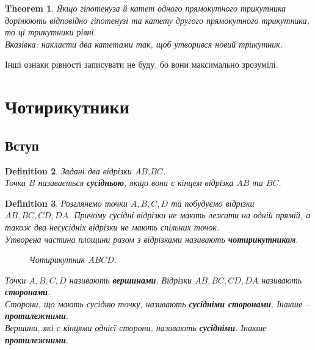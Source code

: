 \documentclass[a4paper, 10pt]{article}
\theoremstyle{theoremdd}
\newtheorem{theorem}{Theorem}[subsection]
\theoremstyle{theoremdd}
\theoremstyle{theoremdd}
\newtheorem{definition}[theorem]{Definition}
\theoremstyle{theoremdd}
\theoremstyle{theoremdd}
\theoremstyle{theoremdd}
\theoremstyle{theoremdd}
\theoremstyle{theoremdd}
\theoremstyle{theoremdd}
\begin{document}
\begin{theorem}
Якщо гіпотенуза й катет одного прямокутного трикутника дорінюють відповідно гіпотенузі та катету другого прямокутного трикутника, то ці трикутники рівні.\\
\textit{Вказівка: накласти два катетами так, щоб утворився новий трикутник.}
\end{theorem}
Інші ознаки рівності записувати не буду, бо вони максимально зрозумілі.
\newpage
\fi

\section{Чотирикутники}
\subsection{Вступ}
\begin{definition}
Задані два відрізки $AB$,$BC$.\\
Точка $B$ називається \textbf{сусідньою}, якщо вона є кінцем відрізка $AB$ та $BC$.
\begin{figure}[H]
\centering
{}
\end{figure}
\end{definition}

\begin{definition}
Розглянемо точки $A,B,C,D$ та побудуємо відрізки $AB,BC,CD,DA$. Причому сусідні відрізки не мають лежати на одній прямій, а також два несусідніх відрізки не мають спільних точок.\\
Утворена частина площини разом з відрізками називають \textbf{чотирикутником}.
\begin{figure}[H]
\centering
{}
\caption*{Чотирикутник $ABCD$.}
\end{figure}
Точки $A,B,C,D$ називають \textbf{вершинами}. Відрізки $AB,BC,CD,DA$ називають \textbf{сторонами}.\\
Сторони, що мають сусідню точку, називають \textbf{сусідніми сторонами}. Інакше -- \textbf{протилежними}.\\
Вершини, які є кінцями однієї сторони, називають \textbf{сусідніми}. Інакше \textbf{протилежними}.
\end{definition}
\end{document}
